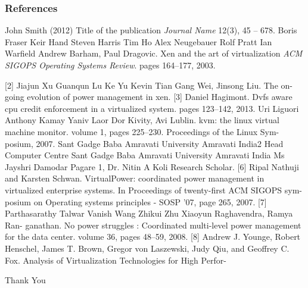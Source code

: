 \documentclass{beamer}
\begin{document}

\begin{frame}
\frametitle{References}
\footnotesize{
\begin{thebibliography}{99} %
 John Smith (2012)
\newblock Title of the publication
\newblock \emph{Journal Name} 12(3), 45 -- 678.
 Boris Fraser Keir Hand Steven Harris Tim Ho Alex Neugebauer Rolf Pratt Ian
Warfield Andrew Barham, Paul Dragovic. 
\newblock Xen and the art of virtualization
\newblock \emph{ACM SIGOPS Operating Systems Review}. pages 164–177, 2003.

[2] Jiajun Xu Guanqun Lu Ke Yu Kevin Tian Gang Wei, Jinsong Liu. The on-going
evolution of power management in xen.
[3] Daniel Hagimont. Dvfs aware cpu credit enforcement in a virtualized system. pages
123–142, 2013.
 Uri Liguori Anthony Kamay Yaniv Laor Dor Kivity, Avi Lublin. kvm: the linux
virtual machine monitor. volume 1, pages 225–230. Proceedings of the Linux Sym-
posium, 2007.
\bibitem{} Sant Gadge Baba Amravati University Amravati India2 Head Computer Centre Sant
Gadge Baba Amravati University Amravati India Ms Jayshri Damodar Pagare 1, Dr.
Nitin A Koli Research Scholar.
[6] Ripal Nathuji and Karsten Schwan. VirtualPower: coordinated power management
in virtualized enterprise systems. In Proceedings of twenty-first ACM SIGOPS sym-
posium on Operating systems principles - SOSP ’07, page 265, 2007.
[7] Parthasarathy Talwar Vanish Wang Zhikui Zhu Xiaoyun Raghavendra, Ramya Ran-
ganathan. No power struggles : Coordinated multi-level power management for the
data center. volume 36, pages 48–59, 2008.
[8] Andrew J. Younge, Robert Henschel, James T. Brown, Gregor von Laszewski, Judy
Qiu, and Geoffrey C. Fox. Analysis of Virtualization Technologies for High Perfor-

\end{thebibliography}
}
\end{frame}


\begin{frame}
\Huge{\centerline{Thank You}}
\end{frame}
\end{document}
